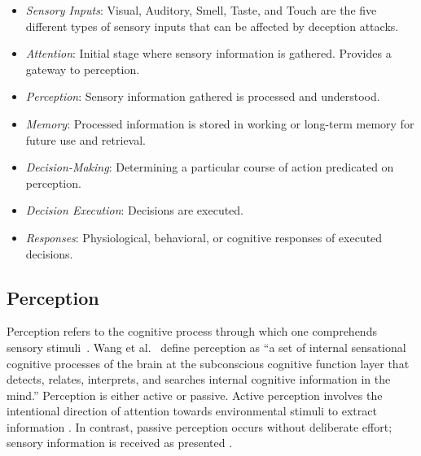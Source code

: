 \begin{itemize}
\itemsep0em
    \item \emph{Sensory Inputs}: Visual, Auditory, Smell, Taste, and Touch are the five different types of sensory inputs that can be affected by deception attacks.
    \item \emph{Attention}: Initial stage where sensory information is gathered. Provides a gateway to perception.
    \item \emph{Perception}: Sensory information gathered is processed and understood.
    \item \emph{Memory}: Processed information is stored in working or long-term memory for future use and retrieval.
    \item \emph{Decision-Making}: Determining a particular course of action predicated on perception.
    \item \emph{Decision Execution}: Decisions are executed.
    \item \emph{Responses}: Physiological, behavioral, or cognitive responses of executed decisions. %
\end{itemize}

\subsection{Perception}
Perception refers to the cognitive process through which one comprehends sensory stimuli~\cite{qiong2017brief}.
Wang et al.~\cite{wang2007cognitive} define perception as ``a set of internal sensational cognitive processes of the brain at the subconscious cognitive function layer that detects, relates, interprets, and searches internal cognitive information in the mind.'' 
Perception is either active or passive.
Active perception involves the intentional direction of attention towards environmental stimuli to extract information \cite{gibson2014ecological}. 
In contrast, passive perception occurs without deliberate effort; sensory information is received as presented \cite{Rock1983-ROCTLO}.



